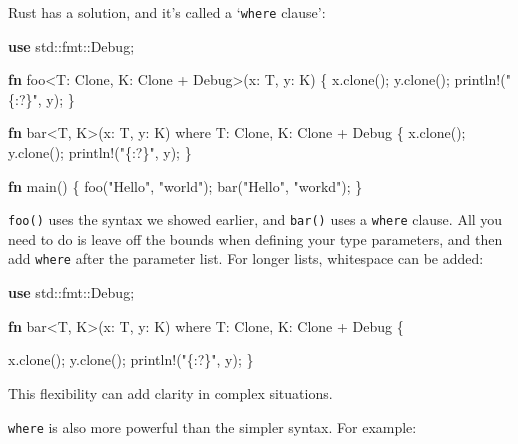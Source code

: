 \documentclass[a4paper,]{book}
\newenvironment{Shaded}{\begin{snugshade}}{\end{snugshade}}
\newcommand{\KeywordTok}[1]{\textcolor[rgb]{0.13,0.29,0.53}{\textbf{{#1}}}}
\newcommand{\StringTok}[1]{\textcolor[rgb]{0.31,0.60,0.02}{{#1}}}
\newcommand{\OtherTok}[1]{\textcolor[rgb]{0.56,0.35,0.01}{{#1}}}
\newcommand{\NormalTok}[1]{{#1}}
\begin{document}
Rust has a solution, and it's called a `\texttt{where} clause':

\begin{Shaded}
\begin{Highlighting}[]
\KeywordTok{use} \NormalTok{std::fmt::Debug;}

\KeywordTok{fn} \NormalTok{foo<T: Clone, K: Clone + Debug>(x: T, y: K) \{}
    \NormalTok{x.clone();}
    \NormalTok{y.clone();}
    \OtherTok{println!}\NormalTok{(}\StringTok{"\{:?\}"}\NormalTok{, y);}
\NormalTok{\}}

\KeywordTok{fn} \NormalTok{bar<T, K>(x: T, y: K) where T: Clone, K: Clone + Debug \{}
    \NormalTok{x.clone();}
    \NormalTok{y.clone();}
    \OtherTok{println!}\NormalTok{(}\StringTok{"\{:?\}"}\NormalTok{, y);}
\NormalTok{\}}

\KeywordTok{fn} \NormalTok{main() \{}
    \NormalTok{foo(}\StringTok{"Hello"}\NormalTok{, }\StringTok{"world"}\NormalTok{);}
    \NormalTok{bar(}\StringTok{"Hello"}\NormalTok{, }\StringTok{"workd"}\NormalTok{);}
\NormalTok{\}}
\end{Highlighting}
\end{Shaded}

\texttt{foo()} uses the syntax we showed earlier, and \texttt{bar()}
uses a \texttt{where} clause. All you need to do is leave off the bounds
when defining your type parameters, and then add \texttt{where} after
the parameter list. For longer lists, whitespace can be added:

\begin{Shaded}
\begin{Highlighting}[]
\KeywordTok{use} \NormalTok{std::fmt::Debug;}

\KeywordTok{fn} \NormalTok{bar<T, K>(x: T, y: K)}
    \NormalTok{where T: Clone,}
          \NormalTok{K: Clone + Debug \{}

    \NormalTok{x.clone();}
    \NormalTok{y.clone();}
    \OtherTok{println!}\NormalTok{(}\StringTok{"\{:?\}"}\NormalTok{, y);}
\NormalTok{\}}
\end{Highlighting}
\end{Shaded}

This flexibility can add clarity in complex situations.

\texttt{where} is also more powerful than the simpler syntax. For
example:
\end{document}
